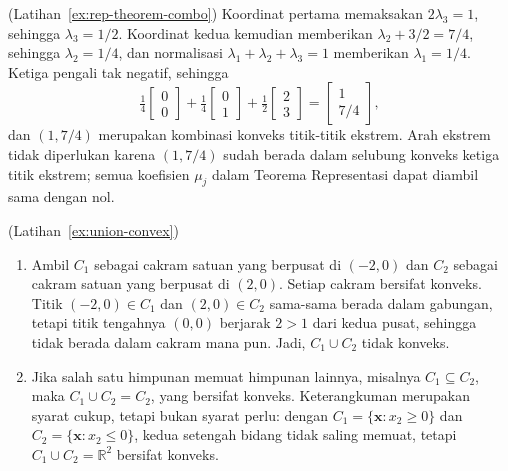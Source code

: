 \begin{solution}(Latihan~\ref{ex:rep-theorem-combo})
Koordinat pertama memaksakan \( 2\lambda_3 = 1 \), sehingga \( \lambda_3 = 1/2 \). Koordinat kedua kemudian memberikan \( \lambda_2 + 3/2 = 7/4 \), sehingga \( \lambda_2 = 1/4 \), dan normalisasi \( \lambda_1 + \lambda_2 + \lambda_3 = 1 \) memberikan \( \lambda_1 = 1/4 \). Ketiga pengali tak negatif, sehingga
\[
\tfrac{1}{4} \begin{bmatrix} 0 \\ 0 \end{bmatrix} + \tfrac{1}{4} \begin{bmatrix} 0 \\ 1 \end{bmatrix} + \tfrac{1}{2} \begin{bmatrix} 2 \\ 3 \end{bmatrix} = \begin{bmatrix} 1 \\ 7/4 \end{bmatrix},
\]
dan \( (1, 7/4) \) merupakan kombinasi konveks titik-titik ekstrem. Arah ekstrem tidak diperlukan karena \( (1, 7/4) \) sudah berada dalam selubung konveks ketiga titik ekstrem; semua koefisien \( \mu_j \) dalam Teorema Representasi dapat diambil sama dengan nol.
\end{solution}

\begin{solution}(Latihan~\ref{ex:union-convex})
\begin{enumerate}
    \item Ambil \( C_1 \) sebagai cakram satuan yang berpusat di \( (-2,0) \) dan \( C_2 \) sebagai cakram satuan yang berpusat di \( (2,0) \). Setiap cakram bersifat konveks. Titik \( (-2,0) \in C_1 \) dan \( (2,0) \in C_2 \) sama-sama berada dalam gabungan, tetapi titik tengahnya \( (0,0) \) berjarak \( 2 > 1 \) dari kedua pusat, sehingga tidak berada dalam cakram mana pun. Jadi, \( C_1 \cup C_2 \) tidak konveks.
    \item Jika salah satu himpunan memuat himpunan lainnya, misalnya \( C_1 \subseteq C_2 \), maka \( C_1 \cup C_2 = C_2 \), yang bersifat konveks. Keterangkuman merupakan syarat cukup, tetapi bukan syarat perlu: dengan \( C_1 = \{ \mathbf{x} : x_2 \geq 0 \} \) dan \( C_2 = \{ \mathbf{x} : x_2 \leq 0 \} \), kedua setengah bidang tidak saling memuat, tetapi \( C_1 \cup C_2 = \mathbb{R}^2 \) bersifat konveks.
\end{enumerate}
\end{solution}
